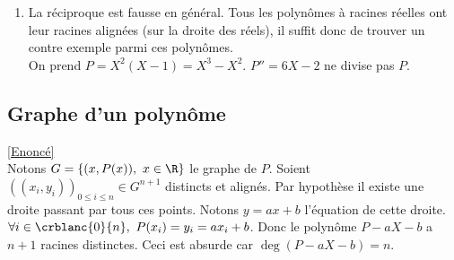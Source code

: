 \documentclass{book}
\begin{document}
\begin{enumerate}
		Ceci montre que les racines de $P$ sont alignées.
		\item La réciproque est fausse en général. Tous les polynômes à racines réelles ont leur racines alignées (sur la droite des réels), il suffit donc de trouver un contre exemple parmi ces polynômes.\\
		On prend $P=X^2(X-1)=X^3-X^2$. $P''=6X-2$ ne divise pas $P$.
	\end{enumerate}
	
	\subsection{Graphe d'un polynôme }
	\label{sec:graphe-d'un-polynôme}
	\textcolor{blue}{\hyperref[Graphe d'un polynôme]{[Enoncé]}}\\
	Notons $G=\{(x,P(x)),\ x\in \R\}$ le graphe de $P$. Soient $((x_i,y_i))_{0\leq i\leq n}\in G^{n+1}$ distincts et alignés. Par hypothèse il existe une droite passant par tous ces points. Notons $y=ax+b$ l'équation de cette droite.\\
	$\forall i\in \crblanc{0}{n},\ P(x_i)=y_i=ax_i+b$. Donc le polynôme $P-aX-b$ a $n+1$ racines distinctes. Ceci est absurde car $\deg(P-aX-b)=n$.
	
\end{document}
